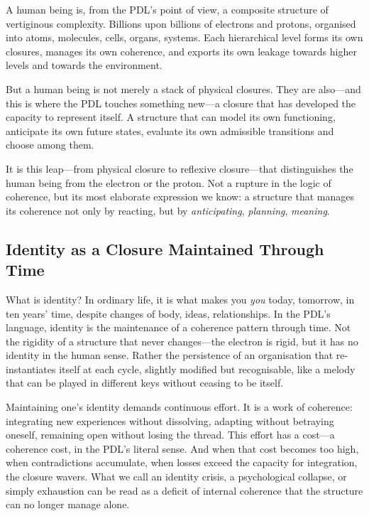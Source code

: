 \documentclass[12pt, a4paper, openright]{book}
\begin{document}
\medskip

A human being is, from the PDL's point of view, a composite structure of vertiginous complexity. Billions upon billions of electrons and protons, organised into atoms, molecules, cells, organs, systems. Each hierarchical level forms its own closures, manages its own coherence, and exports its own leakage towards higher levels and towards the environment.

\medskip

But a human being is not merely a stack of physical closures. They are also---and this is where the PDL touches something new---a closure that has developed the capacity to represent itself. A structure that can model its own functioning, anticipate its own future states, evaluate its own admissible transitions and choose among them.

\medskip

It is this leap---from physical closure to reflexive closure---that distinguishes the human being from the electron or the proton. Not a rupture in the logic of coherence, but its most elaborate expression we know: a structure that manages its coherence not only by reacting, but by \emph{anticipating}, \emph{planning}, \emph{meaning}.

\subsection*{Identity as a Closure Maintained Through Time}

What is identity? In ordinary life, it is what makes you \emph{you} today, tomorrow, in ten years' time, despite changes of body, ideas, relationships. In the PDL's language, identity is the maintenance of a coherence pattern through time. Not the rigidity of a structure that never changes---the electron is rigid, but it has no identity in the human sense. Rather the persistence of an organisation that re-instantiates itself at each cycle, slightly modified but recognisable, like a melody that can be played in different keys without ceasing to be itself.

\medskip

Maintaining one's identity demands continuous effort. It is a work of coherence: integrating new experiences without dissolving, adapting without betraying oneself, remaining open without losing the thread. This effort has a cost---a coherence cost, in the PDL's literal sense. And when that cost becomes too high, when contradictions accumulate, when losses exceed the capacity for integration, the closure wavers. What we call an identity crisis, a psychological collapse, or simply exhaustion can be read as a deficit of internal coherence that the structure can no longer manage alone.
\end{document}

